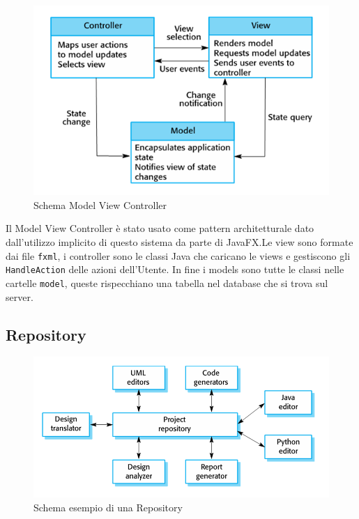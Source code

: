 \documentclass[12pt, a4paper]{report}
\begin{document}
\begin{figure}[h]
  \centering
  \includegraphics[width=\textwidth]{MVC.PNG}
  \caption{Schema Model View Controller}
\end{figure}

Il Model View Controller è stato usato come pattern architetturale dato
dall'utilizzo implicito di questo sistema da parte di JavaFX.\@ Le view sono
formate dai file \verb|fxml|, i controller sono le classi Java che caricano le
views e gestiscono gli \verb|HandleAction| delle azioni dell'Utente. In fine
i models sono tutte le classi nelle cartelle \verb|model|, queste rispecchiano
una tabella nel database che si trova sul server.

\newpage

\subsection{Repository}

\begin{figure}[h]
  \centering
  \includegraphics[width=\textwidth]{Repository.PNG}
  \caption{Schema esempio di una Repository}
\end{figure}
\end{document}
